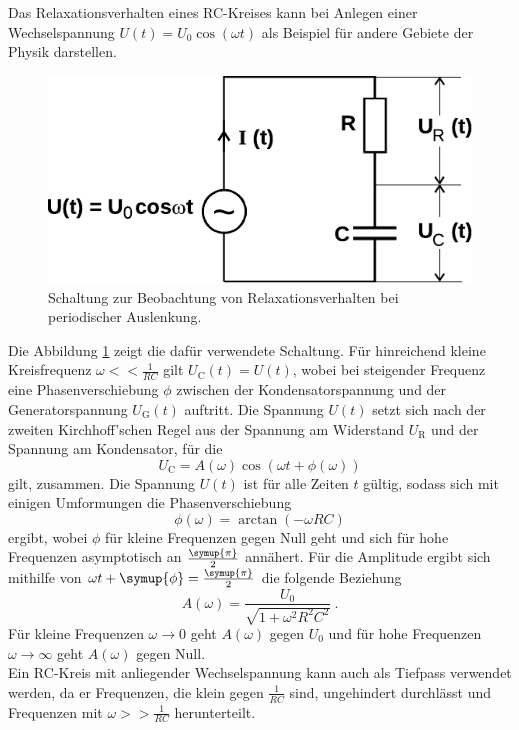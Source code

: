     Das Relaxationsverhalten eines RC-Kreises kann bei Anlegen einer Wechselspannung $U(t) = U_0 \cos(\omega t)$ als Beispiel für andere Gebiete der Physik darstellen.

    \clearpage
    \begin{figure}
        \centering
        \includegraphics{content/img/Abb_2.pdf}
        \caption{Schaltung zur Beobachtung von Relaxationsverhalten bei periodischer Auslenkung.}
        \label{fig:schaltung_wechselspannung}
    \end{figure}

    Die Abbildung \ref{fig:schaltung_wechselspannung} zeigt die dafür verwendete Schaltung.
    Für hinreichend kleine Kreisfrequenz $\omega << \frac{1}{RC}$ gilt $U_\text{C}(t) = U(t)$,
    wobei bei steigender Frequenz eine Phasenverschiebung $\phi$ zwischen der Kondensatorspannung und der Generatorspannung $U_\text{G}(t)$ auftritt.
    Die Spannung $U(t)$ setzt sich nach der zweiten Kirchhoff'schen Regel aus der Spannung am Widerstand $U_\text{R}$ und der Spannung am Kondensator,
    für die
    \begin{equation}
        U_\text{C} = A(\omega) \cos{(\omega t + \phi(\omega))}
    \end{equation}
    gilt,
    zusammen.
    Die Spannung $U(t)$ ist für alle Zeiten $t$ gültig,
    sodass sich mit einigen Umformungen die Phasenverschiebung
    \begin{equation}
        \phi(\omega) = \arctan{(- \omega RC)}
        \label{eqn:phasenverschiebung}
    \end{equation}
    ergibt,
    wobei $\phi$ für kleine Frequenzen gegen Null geht und sich für hohe Frequenzen asymptotisch an $\frac{\symup{\pi}}{2}$ annähert.
    Für die Amplitude ergibt sich mithilfe von $\omega t + \symup{\phi} = \frac{\symup{\pi}}{2}$ die folgende Beziehung
    \begin{equation}
        A(\omega) = \frac{U_0}{\sqrt{1 + {\omega}^2 R^2 C^2}} \ .
        \label{eqn:amplitude}
    \end{equation}
    Für kleine Frequenzen $\omega \to 0$ geht $A(\omega)$ gegen $U_0$ und für hohe Frequenzen $\omega \to \infty$ geht $A(\omega)$ gegen Null.\\
    Ein RC-Kreis mit anliegender Wechselspannung kann auch als Tiefpass verwendet werden,
    da er Frequenzen,
    die klein gegen $\frac{1}{RC}$ sind,
    ungehindert durchlässt und Frequenzen mit $\omega >> \frac{1}{RC}$ herunterteilt.

